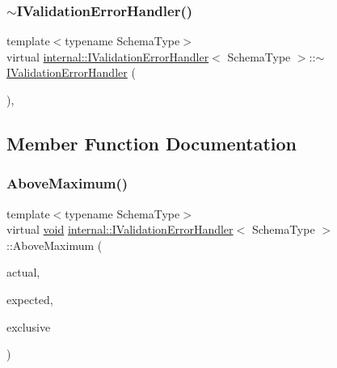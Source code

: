 \subsubsection{\texorpdfstring{$\sim$\+I\+Validation\+Error\+Handler()}{~IValidationErrorHandler()}}
{\footnotesize\ttfamily template$<$typename Schema\+Type$>$ \\
virtual \hyperlink{classinternal_1_1IValidationErrorHandler}{internal\+::\+I\+Validation\+Error\+Handler}$<$ Schema\+Type $>$\+::$\sim$\hyperlink{classinternal_1_1IValidationErrorHandler}{I\+Validation\+Error\+Handler} (\begin{DoxyParamCaption}{ }\end{DoxyParamCaption})\hspace{0.3cm}{\ttfamily [inline]}, {\ttfamily [virtual]}}



\subsection{Member Function Documentation}
\mbox{\label{classinternal_1_1IValidationErrorHandler_a7dc32dfac536f8577cbcb702efde26d2}} 
\subsubsection{\texorpdfstring{Above\+Maximum()}{AboveMaximum()}\hspace{0.1cm}{\footnotesize\ttfamily [1/3]}}
{\footnotesize\ttfamily template$<$typename Schema\+Type$>$ \\
virtual \hyperlink{imgui__impl__opengl3__loader_8h_ac668e7cffd9e2e9cfee428b9b2f34fa7}{void} \hyperlink{classinternal_1_1IValidationErrorHandler}{internal\+::\+I\+Validation\+Error\+Handler}$<$ Schema\+Type $>$\+::Above\+Maximum (\begin{DoxyParamCaption}\item[{\hyperlink{stdint_8h_a414156feea104f8f75b4ed9e3121b2f6}{int64\+\_\+t}}]{actual,  }\item[{const \hyperlink{classinternal_1_1IValidationErrorHandler_a22eda6c4ea9537f1ba00d76af052649a}{S\+Value} \&}]{expected,  }\item[{bool}]{exclusive }\end{DoxyParamCaption})\hspace{0.3cm}{\ttfamily [pure virtual]}}


